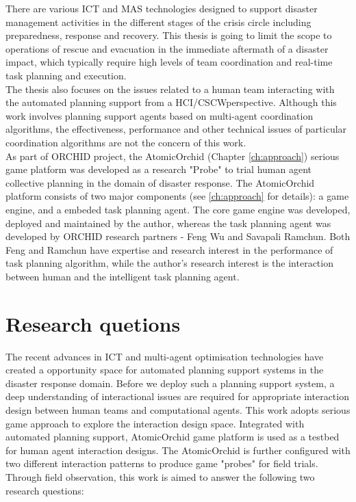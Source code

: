 There are various \ac{ICT} and \ac{MAS} technologies designed to support disaster management activities in the different stages of the crisis circle including preparedness, response and recovery. This thesis is going to limit the scope to operations of rescue and evacuation in the immediate aftermath of a disaster impact, which typically require high levels of team coordination and real-time task planning and execution.\\ 

The thesis also focuses on the issues related to a human team interacting with the automated planning support from a \ac{HCI}/\ac{CSCW}perspective. Although this work involves planning support agents based on multi-agent coordination algorithms, the effectiveness, performance and other technical issues of particular coordination algorithms are not the concern of this work.\\

As part of ORCHID project, the AtomicOrchid (Chapter \ref{ch:approach}) serious game platform was developed as a research "Probe" to trial human agent collective planning in the domain of disaster response. The AtomicOrchid platform consists of two major components (see \ref{ch:approach} for details): a game engine, and a embeded task planning agent. The core game engine was developed, deployed and maintained by the author, whereas the task planning agent was developed by ORCHID research partners - Feng Wu and Savapali Ramchun. Both Feng and Ramchun have expertise and research interest in the performance of task planning algorithm, while the author's research interest is the interaction between human and the intelligent task planning agent. \\

\section{Research quetions}
The recent advances in \ac{ICT} and multi-agent optimisation technologies have created a opportunity space for automated planning support systems in the disaster response domain. Before we deploy such a planning support system, a deep understanding of interactional issues are required for appropriate interaction design between human teams and computational agents. This work adopts serious game approach to explore the interaction design space. Integrated with automated planning support, AtomicOrchid game platform is used as a testbed for human agent interaction designs.  The AtomicOrchid is further configured with two different interaction patterns to produce game "probes" for field trials. Through field observation, this work is aimed to answer the following two research questions:

